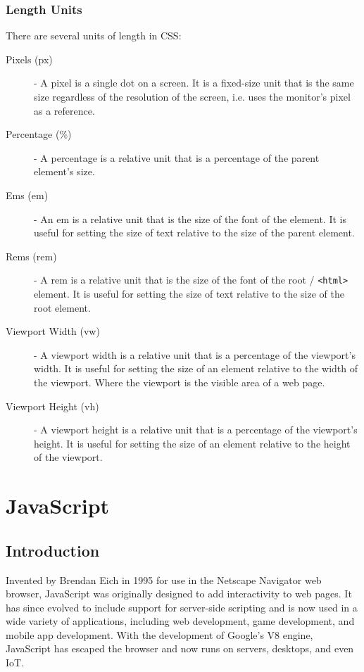 \documentclass[12pt letter]{report}
\begin{document}
\subsection{Length Units}
There are several units of length in CSS:
\begin{description}
  \item[Pixels (px)] - A pixel is a single dot on a screen. It is a fixed-size unit that is the same size regardless of
        the resolution of the screen, i.e. uses the monitor's pixel as a reference.
  \item[Percentage (\%)] - A percentage is a relative unit that is a percentage of the parent element's size.
  \item[Ems (em)] - An em is a relative unit that is the size of the font of the element. It is useful for setting the
        size of text relative to the size of the parent element.
  \item[Rems (rem)] - A rem is a relative unit that is the size of the font of the root / \lstinline{<html>} element. It is useful for setting
        the size of text relative to the size of the root element.
  \item[Viewport Width (vw)] - A viewport width is a relative unit that is a percentage of the viewport's width. It is
        useful for setting the size of an element relative to the width of the viewport. Where the viewport is the visible
        area of a web page.
  \item[Viewport Height (vh)] - A viewport height is a relative unit that is a percentage of the viewport's height. It is
        useful for setting the size of an element relative to the height of the viewport.
\end{description}


\chapter{JavaScript}

\section{Introduction}


Invented by Brendan Eich in 1995 for use in the Netscape Navigator web browser, JavaScript was originally designed to
add interactivity to web pages. It has since evolved to include support for server-side scripting and is now used in a
wide variety of applications, including web development, game development, and mobile app development. With the
development of Google's V8 engine, JavaScript has escaped the browser and now runs on servers, desktops, and even IoT.
\end{document}
